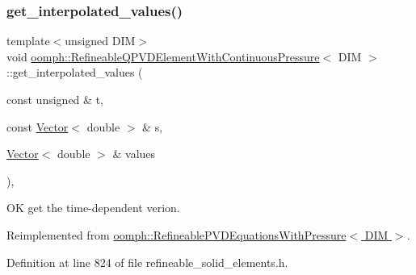 \subsubsection{\texorpdfstring{get\+\_\+interpolated\+\_\+values()}{get\_interpolated\_values()}\hspace{0.1cm}{\footnotesize\ttfamily [2/2]}}
{\footnotesize\ttfamily template$<$unsigned D\+IM$>$ \\
void \hyperlink{classoomph_1_1RefineableQPVDElementWithContinuousPressure}{oomph\+::\+Refineable\+Q\+P\+V\+D\+Element\+With\+Continuous\+Pressure}$<$ D\+IM $>$\+::get\+\_\+interpolated\+\_\+values (\begin{DoxyParamCaption}\item[{const unsigned \&}]{t,  }\item[{const \hyperlink{classoomph_1_1Vector}{Vector}$<$ double $>$ \&}]{s,  }\item[{\hyperlink{classoomph_1_1Vector}{Vector}$<$ double $>$ \&}]{values }\end{DoxyParamCaption})\hspace{0.3cm}{\ttfamily [inline]}, {\ttfamily [virtual]}}



OK get the time-\/dependent verion. 



Reimplemented from \hyperlink{classoomph_1_1RefineablePVDEquationsWithPressure_a15ee8b0656b7957c7063aefc3acc5d50}{oomph\+::\+Refineable\+P\+V\+D\+Equations\+With\+Pressure$<$ D\+I\+M $>$}.



Definition at line 824 of file refineable\+\_\+solid\+\_\+elements.\+h.

\mbox{\label{classoomph_1_1RefineableQPVDElementWithContinuousPressure_ac2b58d140461e737e6e013ea26489e0c}} 
